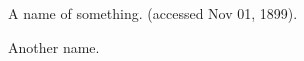 \documentclass{article}
\begin{document}
\begin{thebibliography}{}

 A name of something. (accessed Nov 01, 1899).

  Another name.

\end{thebibliography}
\end{document}
